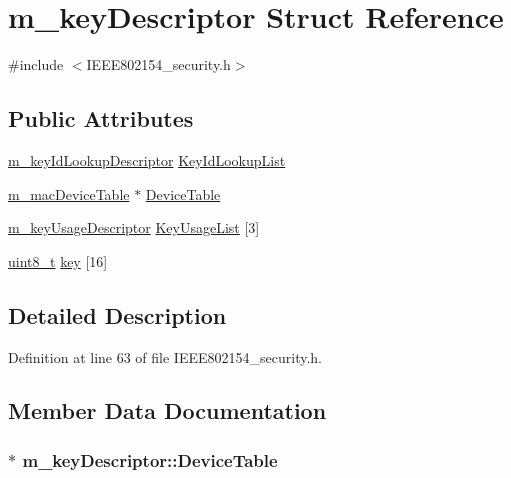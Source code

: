 \hypertarget{structm__key_descriptor}{}\section{m\+\_\+key\+Descriptor Struct Reference}
\label{structm__key_descriptor}


{\ttfamily \#include $<$I\+E\+E\+E802154\+\_\+security.\+h$>$}

\subsection*{Public Attributes}
\begin{DoxyCompactItemize}
\item 
\hyperlink{structm__key_id_lookup_descriptor}{m\+\_\+key\+Id\+Lookup\+Descriptor} \hyperlink{structm__key_descriptor_ad637ea689a0a3d949ee8d5d7a5210ddd}{Key\+Id\+Lookup\+List}
\item 
\hyperlink{structm__mac_device_table}{m\+\_\+mac\+Device\+Table} $\ast$ \hyperlink{structm__key_descriptor_ab8d69032505f500c260e0bfc25ee6600}{Device\+Table}
\item 
\hyperlink{structm__key_usage_descriptor}{m\+\_\+key\+Usage\+Descriptor} \hyperlink{structm__key_descriptor_a94d22454d2ebcd35420695d0aa1053cb}{Key\+Usage\+List} \mbox{[}3\mbox{]}
\item 
\hyperlink{_p_e___types_8h_aba7bc1797add20fe3efdf37ced1182c5}{uint8\+\_\+t} \hyperlink{structm__key_descriptor_a858158ce9fb438694b20903224536e9c}{key} \mbox{[}16\mbox{]}
\end{DoxyCompactItemize}


\subsection{Detailed Description}


Definition at line 63 of file I\+E\+E\+E802154\+\_\+security.\+h.



\subsection{Member Data Documentation}
\subsubsection[{\texorpdfstring{Device\+Table}{DeviceTable}}]{$\ast$ m\+\_\+key\+Descriptor\+::\+Device\+Table}\hypertarget{structm__key_descriptor_ab8d69032505f500c260e0bfc25ee6600}{}\label{structm__key_descriptor_ab8d69032505f500c260e0bfc25ee6600}


